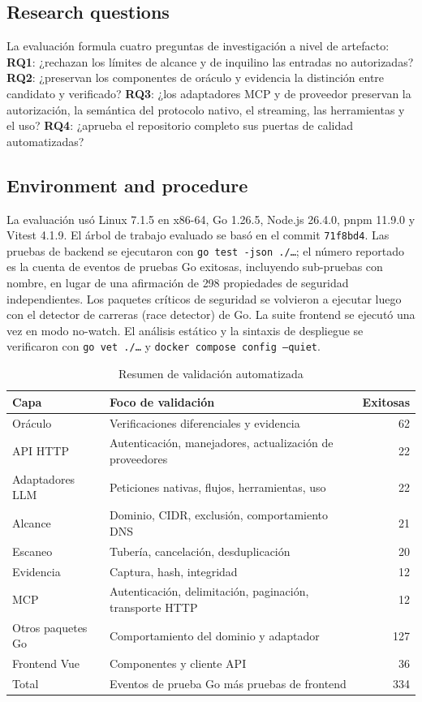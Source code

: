 \documentclass[conference,a4paper]{IEEEtran}
\newcommand{\code}[1]{\texttt{#1}}
\begin{document}
\subsection{Research questions}

La evaluación formula cuatro preguntas de investigación a nivel de artefacto: \textbf{RQ1}: ¿rechazan los límites de alcance y de inquilino las entradas no autorizadas? \textbf{RQ2}: ¿preservan los componentes de oráculo y evidencia la distinción entre candidato y verificado? \textbf{RQ3}: ¿los adaptadores MCP y de proveedor preservan la autorización, la semántica del protocolo nativo, el streaming, las herramientas y el uso? \textbf{RQ4}: ¿aprueba el repositorio completo sus puertas de calidad automatizadas?

\subsection{Environment and procedure}

La evaluación usó Linux 7.1.5 en x86-64, Go 1.26.5, Node.js 26.4.0, pnpm 11.9.0 y Vitest 4.1.9. El árbol de trabajo evaluado se basó en el commit \code{71f8bd4}. Las pruebas de backend se ejecutaron con \code{go test -json ./\ldots}; el número reportado es la cuenta de eventos de pruebas Go exitosas, incluyendo sub-pruebas con nombre, en lugar de una afirmación de 298 propiedades de seguridad independientes. Los paquetes críticos de seguridad se volvieron a ejecutar luego con el detector de carreras (race detector) de Go. La suite frontend se ejecutó una vez en modo no-watch. El análisis estático y la sintaxis de despliegue se verificaron con \code{go vet ./\ldots} y \code{docker compose config --quiet}.

\begin{table}[t]
\centering
\caption{Resumen de validación automatizada}
\label{tab:validation}
\begin{tabular}{p{}p{}r}
\toprule
Capa & Foco de validación & Exitosas \\
\midrule
Oráculo & Verificaciones diferenciales y evidencia & 62 \\
API HTTP & Autenticación, manejadores, actualización de proveedores & 22 \\
Adaptadores LLM & Peticiones nativas, flujos, herramientas, uso & 22 \\
Alcance & Dominio, CIDR, exclusión, comportamiento DNS & 21 \\
Escaneo & Tubería, cancelación, desduplicación & 20 \\
Evidencia & Captura, hash, integridad & 12 \\
MCP & Autenticación, delimitación, paginación, transporte HTTP & 12 \\
Otros paquetes Go & Comportamiento del dominio y adaptador & 127 \\
Frontend Vue & Componentes y cliente API & 36 \\
\midrule
Total & Eventos de prueba Go más pruebas de frontend & 334 \\
\bottomrule
\end{tabular}
\end{table}
\end{document}

